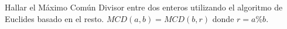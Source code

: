 Hallar el Máximo Común Divisor entre dos enteros utilizando el algoritmo de Euclides basado en el resto. \( MCD(a, b) = MCD(b, r) \) donde \( r = a \% b \).
